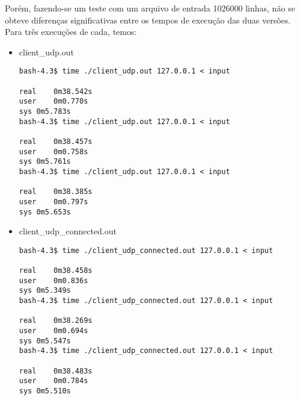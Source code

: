 \documentclass[a4paper,10pt]{article}
\begin{document}
Porém, fazendo-se um teste com um arquivo de entrada 1026000 linhas, não se obteve diferenças significativas entre os tempos de execução das duas versões. Para três execuções de cada, temos:

\begin{itemize}
\item client\_udp.out

\begin{lstlisting}
bash-4.3$ time ./client_udp.out 127.0.0.1 < input 

real	0m38.542s
user	0m0.770s
sys	0m5.783s
bash-4.3$ time ./client_udp.out 127.0.0.1 < input 

real	0m38.457s
user	0m0.758s
sys	0m5.761s
bash-4.3$ time ./client_udp.out 127.0.0.1 < input 

real	0m38.385s
user	0m0.797s
sys	0m5.653s

\end{lstlisting}

\item client\_udp\_connected.out

\begin{lstlisting}
bash-4.3$ time ./client_udp_connected.out 127.0.0.1 < input 

real	0m38.458s
user	0m0.836s
sys	0m5.349s
bash-4.3$ time ./client_udp_connected.out 127.0.0.1 < input 

real	0m38.269s
user	0m0.694s
sys	0m5.547s
bash-4.3$ time ./client_udp_connected.out 127.0.0.1 < input 

real	0m38.483s
user	0m0.784s
sys	0m5.510s

\end{lstlisting}

\end{itemize}
\end{document}

